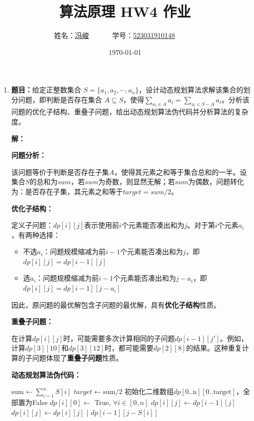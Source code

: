 \documentclass[UTF8,12pt,a4paper]{ctexart}
\title{算法原理 HW4 作业}
\author{
	姓名：\underline{冯峻}~~~~~~
	学号：\underline{523031910148}~~~~~~}
\date{\today}
\begin{document}
\fancyfoot[C]{\thepage}

\maketitle
\tableofcontents

\begin{enumerate}[1.]
	\item \textbf{题目：}给定正整数集合 $S=\{a_1, a_2,\cdots, a_n\}$，设计动态规划算法求解该集合的划分问题，即判断是否存在集合 $A\subseteq S$，使得$\sum_{a_i\in A}a_i=\sum_{a_i\in S-A}a_i$。分析该问题的优化子结构、重叠子问题，给出动态规划算法伪代码并分析算法的复杂度。

	\textbf{解：}

	\textbf{问题分析：}

	该问题等价于判断是否存在子集$A$，使得其元素之和等于集合总和的一半。设集合$S$的总和为$sum$，若$sum$为奇数，则显然无解；若$sum$为偶数，问题转化为：是否存在子集，其元素之和等于$target = sum/2$。

	\textbf{优化子结构：}

	定义子问题：$dp[i][j]$表示使用前$i$个元素能否凑出和为$j$。对于第$i$个元素$a_i$，有两种选择：
	\begin{itemize}
		\item 不选$a_i$：问题规模缩减为前$i-1$个元素能否凑出和为$j$，即$dp[i][j] = dp[i-1][j]$
		\item 选$a_i$：问题规模缩减为前$i-1$个元素能否凑出和为$j-a_i$，即$dp[i][j] = dp[i-1][j-a_i]$
	\end{itemize}
	
	因此，原问题的最优解包含子问题的最优解，具有\textbf{优化子结构}性质。

	\textbf{重叠子问题：}

	在计算$dp[i][j]$时，可能需要多次计算相同的子问题$dp[i-1][j']$。例如，计算$dp[3][10]$和$dp[3][12]$时，都可能需要$dp[2][8]$的结果。这种重复计算的子问题体现了\textbf{重叠子问题}性质。

	\textbf{动态规划算法伪代码：}
	\begin{algorithm}[H]%
		\caption{SUBSET-PARTITION($S$)}
		\begin{algorithmic}[1]
			\State $\text{sum} \gets \sum_{i=1}^{n} S[i]$
				\State {}
			\EndIf
			\State $target \gets \text{sum} / 2$
			\State 初始化二维数组$dp[0..\text{n}][0..\text{target}]$，全部置为False
			\State $dp[i][0] \gets$ True, $\forall i \in [0, n]$ 
					\State $dp[i][j] \gets dp[i-1][j]$ 
						\State $dp[i][j] \gets dp[i][j]$ | $dp[i-1][j-S[i]]$ 
					\EndIf
				\EndFor
			\EndFor
			\State {}
		\end{algorithmic}
	\end{algorithm}


\end{enumerate}
\end{document}
